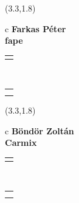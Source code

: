 \documentclass[11pt]{article}
\begin{document}
\makebox(3.3,1.8){
  \renewcommand\arraystretch{1.3}
  \begin{tabular}[c]{c}
    \hspace{8.5mm}
    \LARGE\bf{ Farkas Péter }\\
    \hspace{8.5mm}
    \Large{ fape }\\
    \renewcommand\arraystretch{3}
    \begin{tabular}[c]{c}
      \centering
      \fontfamily{phv}\selectfont{
        \textbf{
          \textsc{
            \scriptsize{
            \color{Dark}{ Ismerkedő }\color{Bright}{ Webmester }\color{Bright}{ Sminkmester }\color{Bright}{ Programozó }
            }
          }
        }
      }
    \end{tabular}
    \\
    \renewcommand\arraystretch{1}
    \begin{tabular}{p{3.3in}}
      \hspace{.7cm}\\
      \hspace{.7cm}\emph{  }\\
    \end{tabular}
  \end{tabular}
}

\makebox(3.3,1.8){
  \renewcommand\arraystretch{1.3}
  \begin{tabular}[c]{c}
    \hspace{8.5mm}
    \LARGE\bf{ Böndör Zoltán }\\
    \hspace{8.5mm}
    \Large{ Carmix }\\
    \renewcommand\arraystretch{3}
    \begin{tabular}[c]{c}
      \centering
      \fontfamily{phv}\selectfont{
        \textbf{
          \textsc{
            \scriptsize{
            \color{Bright}{ Ismerkedő }\color{Dark}{ Webmester }\color{Dark}{ Sminkmester }\color{Dark}{ Programozó }
            }
          }
        }
      }
    \end{tabular}
    \\
    \renewcommand\arraystretch{1}
    \begin{tabular}{p{3.3in}}
      \hspace{.7cm}\\
      \hspace{.7cm}\emph{  }\\
    \end{tabular}
  \end{tabular}
}
\end{document}
